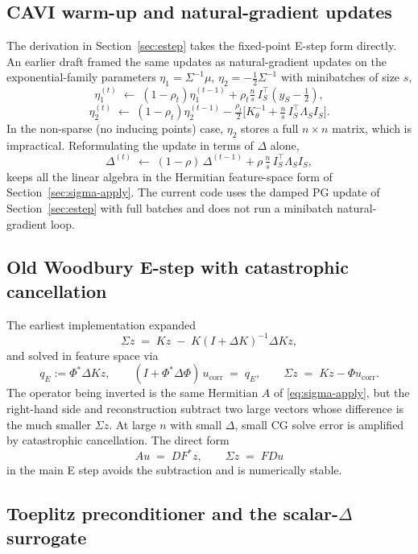 \documentclass{article}
\begin{document}
\subsection{CAVI warm-up and natural-gradient updates}
\label{app:cavi}

The derivation in Section~\ref{sec:estep} takes the fixed-point E-step form directly. An earlier draft framed the same updates as natural-gradient updates on the exponential-family parameters $\eta_1=\Sigma^{-1}\mu$, $\eta_2=-\tfrac12\Sigma^{-1}$ with minibatches of size $s$,
\[
  \eta_1^{(t)} \;\leftarrow\;
  (1-\rho_t)\eta_1^{(t-1)} + \rho_t\tfrac{n}{s}\,I_S^{\top}(y_S-\tfrac12),
\]
\[
  \eta_2^{(t)} \;\leftarrow\;
  (1-\rho_t)\eta_2^{(t-1)} - \tfrac{\rho_t}{2}\bigl[K_\theta^{-1}+\tfrac{n}{s}\,I_S^{\top}\Lambda_S I_S\bigr].
\]
In the non-sparse (no inducing points) case, $\eta_2$ stores a full $n\times n$ matrix, which is impractical. Reformulating the update in terms of $\Delta$ alone,
\[
  \Delta^{(t)} \;\leftarrow\; (1-\rho)\,\Delta^{(t-1)} + \rho\,\tfrac{n}{s}\,I_S^{\top}\Lambda_S I_S,
\]
keeps all the linear algebra in the Hermitian feature-space form of Section~\ref{sec:sigma-apply}. The current code uses the damped PG update of Section~\ref{sec:estep} with full batches and does not run a minibatch natural-gradient loop.

\subsection{Old Woodbury E-step with catastrophic cancellation}
\label{app:woodbury}

The earliest implementation expanded
\[
  \Sigma z
  \;=\;
  Kz \;-\; K(I+\Delta K)^{-1}\Delta K z,
\]
and solved in feature space via
\[
  q_E := \Phi^{*}\Delta K z,
  \qquad
  (I+\Phi^{*}\Delta\Phi)\,u_{\text{corr}} \;=\; q_E,
  \qquad
  \Sigma z \;=\; Kz - \Phi u_{\text{corr}}.
\]
The operator being inverted is the same Hermitian $A$ of \eqref{eq:sigma-apply}, but the right-hand side and reconstruction subtract two large vectors whose difference is the much smaller $\Sigma z$. At large $n$ with small $\Delta$, small CG solve error is amplified by catastrophic cancellation. The direct form
\[
  A u \;=\; D F^{*}z,
  \qquad
  \Sigma z \;=\; F D u
\]
in the main E step avoids the subtraction and is numerically stable.

\subsection{Toeplitz preconditioner and the scalar-$\Delta$ surrogate}
\label{app:precond}
\end{document}
